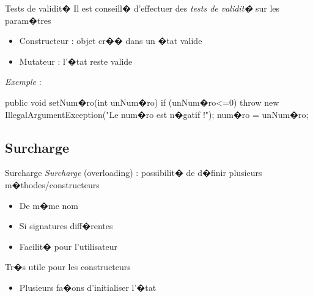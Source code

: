 \begin{frame}[fragile]{Tests de validit�}
Il est conseill� d'effectuer des \emph{tests de validit�} sur les param�tres
\begin{itemize}
\item Constructeur : objet cr�� dans un �tat valide
\item Mutateur : l'�tat reste valide
\end{itemize}
\emph{Exemple} :
\begin{Java}
  public void setNum�ro(int unNum�ro) {
    if (unNum�ro<=0) {
      throw new IllegalArgumentException("Le num�ro est n�gatif !");
    }
    num�ro = unNum�ro;
  }
\end{Java}
\end{frame}


\subsection{Surcharge}

\begin{frame}{Surcharge}
\emph{Surcharge} (overloading) : possibilit� de d�finir plusieurs m�thodes/constructeurs
\begin{itemize}
\item De m�me nom
\item Si signatures diff�rentes
\item Facilit� pour l'utilisateur
\end{itemize}
\bigskip
Tr�s utile pour les constructeurs
\begin{itemize}
\item Plusieurs fa�ons d'initialiser l'�tat
\end{itemize}
\end{frame}

